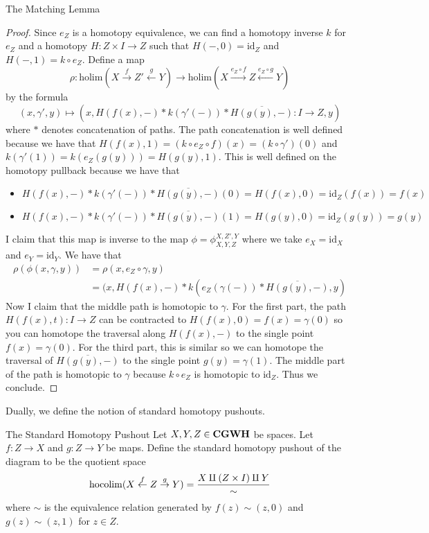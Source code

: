 \documentclass[a4paper]{article}
\begin{document}
\begin{thm}{The Matching Lemma}{}
\begin{proof}
Since $e_Z$ is a homotopy equivalence, we can find a homotopy inverse $k$ for $e_Z$ and a homotopy $H:Z\times I\to Z$ such that $H(-,0)=\text{id}_Z$ and $H(-,1)=k\circ e_Z$. Define a map $$\rho:\text{holim}(X\overset{f}{\rightarrow}Z'\overset{g}{\leftarrow}Y)\to\text{holim}(X\overset{e_Z\circ f}{\rightarrow}Z\overset{e_Z\circ g}{\leftarrow}Y)$$ by the formula $$(x,\gamma',y)\mapsto(x,H(f(x),-)\ast k(\gamma'(-))\ast\overline{H(g(y),-)}:I\to Z,y)$$ where $\ast$ denotes concatenation of paths. The path concatenation is well defined because we have that $H(f(x),1)=(k\circ e_Z\circ f)(x)=(k\circ\gamma')(0)$ and $k(\gamma'(1))=k(e_Z(g(y)))=H(g(y),1)$. This is well defined on the homotopy pullback because we have that 
\begin{itemize}
\item $H(f(x),-)\ast k(\gamma'(-))\ast\overline{H(g(y),-)}(0)=H(f(x),0)=\text{id}_Z(f(x))=f(x)$
\item $H(f(x),-)\ast k(\gamma'(-))\ast\overline{H(g(y),-)}(1)=H(g(y),0)=\text{id}_Z(g(y))=g(y)$
\end{itemize}
I claim that this map is inverse to the map $\phi=\phi_{X,Y,Z}^{X,Z',Y}$ where we take $e_X=\text{id}_X$ and $e_Y=\text{id}_Y$. We have that 
\begin{align*}
\rho(\phi(x,\gamma,y))&=\rho(x,e_Z\circ\gamma,y)\\
&=(x,H(f(x),-)\ast k(e_Z(\gamma(-))\ast\overline{H(g(y),-)},y)
\end{align*}
Now I claim that the middle path is homotopic to $\gamma$. For the first part, the path $H(f(x),t):I\to Z$ can be contracted to $H(f(x),0)=f(x)=\gamma(0)$ so you can homotope the traversal along $H(f(x),-)$ to the single point $f(x)=\gamma(0)$. For the third part, this is similar so we can homotope the traversal of $\overline{H(g(y),-)}$ to the single point $g(y)=\gamma(1)$. The middle part of the path is homotopic to $\gamma$ because $k\circ e_Z$ is homotopic to $\text{id}_Z$. Thus we conclude. 
\end{proof}
\end{thm}

Dually, we define the notion of standard homotopy pushouts. 

\begin{defn}{The Standard Homotopy Pushout}{} Let $X,Y,Z\in\bold{CGWH}$ be spaces. Let $f:Z\to X$ and $g:Z\to Y$ be maps. Define the standard homotopy pushout of the diagram to be the quotient space $$\operatorname*{hocolim}(X\overset{f}{\leftarrow}Z\overset{g}{\rightarrow}Y)=\frac{X\amalg(Z\times I)\amalg Y}{\sim}$$ where $\sim$ is the equivalence relation generated by $f(z)\sim (z,0)$ and $g(z)\sim(z,1)$ for $z\in Z$. 
\end{defn}
\end{document}
